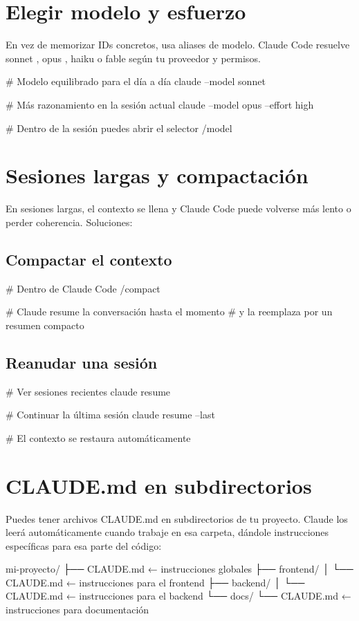 \documentclass[11pt,a4paper]{book}
\begin{document}
\section{Elegir modelo y esfuerzo}
En vez de memorizar IDs concretos, usa aliases de modelo. Claude Code resuelve sonnet , opus , haiku o fable según tu proveedor y permisos.

\begin{codebox}
# Modelo equilibrado para el día a día
claude --model sonnet

# Más razonamiento en la sesión actual
claude --model opus --effort high

# Dentro de la sesión puedes abrir el selector
/model
\end{codebox}
\section{Sesiones largas y compactación}
En sesiones largas, el contexto se llena y Claude Code puede volverse más lento o perder coherencia. Soluciones:

\subsection{Compactar el contexto}
\begin{codebox}
# Dentro de Claude Code
/compact

# Claude resume la conversación hasta el momento
# y la reemplaza por un resumen compacto
\end{codebox}
\subsection{Reanudar una sesión}
\begin{codebox}
# Ver sesiones recientes
claude resume

# Continuar la última sesión
claude resume --last

# El contexto se restaura automáticamente
\end{codebox}
\section{CLAUDE.md en subdirectorios}
Puedes tener archivos CLAUDE.md en subdirectorios de tu proyecto. Claude los leerá automáticamente cuando trabaje en esa carpeta, dándole instrucciones específicas para esa parte del código:

\begin{codebox}
mi-proyecto/
├── CLAUDE.md              ← instrucciones globales
├── frontend/
│   └── CLAUDE.md          ← instrucciones para el frontend
├── backend/
│   └── CLAUDE.md          ← instrucciones para el backend
└── docs/
    └── CLAUDE.md          ← instrucciones para documentación
\end{codebox}
\end{document}
